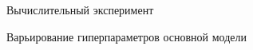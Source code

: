 \documentclass[9pt,pdf]{beamer} %
\begin{document}
\begin{frame}{Вычислительный эксперимент}
\begin{block}{Варьирование гиперпараметров основной модели}
\begin{figure}[h!]
    \centering
    \label{subs_delta_MSE_dt}
    \hfill
    \centering
    \label{subs_MSE_alpha}
  
\end{figure}
\end{block}

\end{frame}
\end{document}
